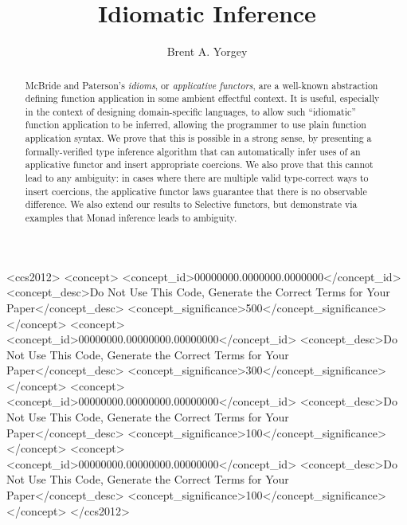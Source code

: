 \documentclass[sigplan,screen]{acmart}
\begin{document}
\title{Idiomatic Inference}

\author{Brent A. Yorgey}

\begin{abstract}
  McBride and Paterson's \emph{idioms}, or \emph{applicative
    functors}, are a well-known abstraction defining function
  application in some ambient effectful context.  It is useful,
  especially in the context of designing domain-specific languages, to
  allow such ``idiomatic'' function application to be inferred,
  allowing the programmer to use plain function application syntax.
  We prove that this is possible in a strong sense, by presenting a
  formally-verified type inference algorithm that can automatically
  infer uses of an applicative functor and insert appropriate
  coercions.  We also prove that this cannot lead to any ambiguity: in
  cases where there are multiple valid type-correct ways to insert
  coercions, the applicative functor laws guarantee that there is no
  observable difference.  We also extend our results to Selective
  functors, but demonstrate via examples that Monad inference leads to
  ambiguity.
\end{abstract}

\begin{CCSXML}
<ccs2012>
 <concept>
  <concept_id>00000000.0000000.0000000</concept_id>
  <concept_desc>Do Not Use This Code, Generate the Correct Terms for Your Paper</concept_desc>
  <concept_significance>500</concept_significance>
 </concept>
 <concept>
  <concept_id>00000000.00000000.00000000</concept_id>
  <concept_desc>Do Not Use This Code, Generate the Correct Terms for Your Paper</concept_desc>
  <concept_significance>300</concept_significance>
 </concept>
 <concept>
  <concept_id>00000000.00000000.00000000</concept_id>
  <concept_desc>Do Not Use This Code, Generate the Correct Terms for Your Paper</concept_desc>
  <concept_significance>100</concept_significance>
 </concept>
 <concept>
  <concept_id>00000000.00000000.00000000</concept_id>
  <concept_desc>Do Not Use This Code, Generate the Correct Terms for Your Paper</concept_desc>
  <concept_significance>100</concept_significance>
 </concept>
</ccs2012>
\end{CCSXML}
\end{document}
